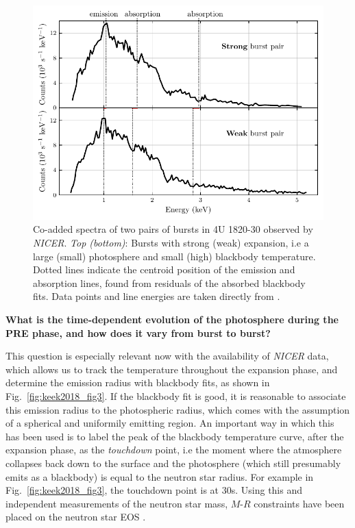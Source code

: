 \documentclass[../main.tex]{subfiles}
\newcommand{\Nicer}{\textit{NICER}}
\begin{document}
\begin{figure}[htb!]
    \centering
    \includegraphics{figures/Strohmayer2019_burstpair_lines.pdf}
    \caption{Co-added spectra of two pairs of bursts in 4U 1820-30 observed by \Nicer. \textit{Top (bottom)}: Bursts with strong (weak) expansion, i.e a large (small) photosphere and small (high) blackbody temperature. Dotted lines indicate the centroid position of the emission and absorption lines, found from residuals of the absorbed blackbody fits. Data points and line energies are taken directly from \citet{Strohmayer2019}.}
    \label{fig:strohmayer_burstpair_lines}
\end{figure}

\noindent\textbf{What is the time-dependent evolution of the photosphere during the PRE phase, and how does it vary from burst to burst?}

This question is especially relevant now with the availability of \Nicer {} data, which allows us to track the temperature throughout the expansion phase, and determine the emission radius with blackbody fits, as shown in Fig.~\ref{fig:keek2018_fig3}. If the blackbody fit is good, it is reasonable to associate this emission radius to the photospheric radius, which comes with the assumption of a spherical and uniformily emitting region. An important way in which this has been used is to label the peak of the blackbody temperature curve, after the expansion phase, as the \textit{touchdown} point, i.e the moment where the atmosphere collapses back down to the surface and the photosphere (which still presumably emits as a blackbody) is equal to the neutron star radius. For example in Fig.~\ref{fig:keek2018_fig3}, the touchdown point is at 30s. Using this and independent measurements of the neutron star mass, $M$-$R$ constraints have been placed on the neutron star EOS \citep{Ozel2016a}. \\
\end{document}
